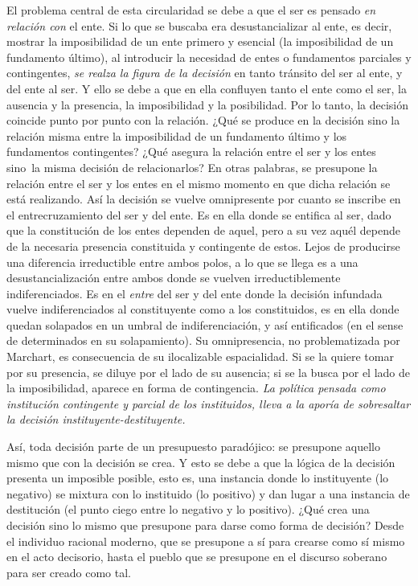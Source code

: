 El problema central de esta circularidad se debe a que el ser es pensado \emph{en relación con} el ente. Si lo que se buscaba era desustancializar al ente, es decir, mostrar la imposibilidad de un ente primero y esencial (la imposibilidad de un fundamento último), al introducir la necesidad de entes o fundamentos parciales y contingentes, \emph{se realza la figura de la decisión} en tanto tránsito del ser al ente, y del ente al ser. Y ello se debe a que en ella confluyen tanto el ente como el ser, la ausencia y la presencia, la imposibilidad y la posibilidad. Por lo tanto, la decisión coincide punto por punto con la relación. ¿Qué se produce en la decisión sino la relación misma entre la imposibilidad de un fundamento último y los fundamentos contingentes? ¿Qué asegura la relación entre el ser y los entes sino~la misma decisión de relacionarlos? En otras palabras, se presupone la relación entre el ser y los entes en el mismo momento en que dicha relación se está realizando. Así la decisión se vuelve omnipresente por cuanto se inscribe en el entrecruzamiento del ser y del ente. Es en ella donde se entifica al ser, dado que la constitución de los entes dependen de aquel, pero a su vez aquél depende de la necesaria presencia constituida y contingente de estos. Lejos de producirse una diferencia irreductible entre ambos polos, a lo que se llega es a una desustancialización entre ambos donde se vuelven irreductiblemente indiferenciados. Es en el \emph{entre} del ser y del ente donde la decisión infundada vuelve indiferenciados al constituyente como a los constituidos, es en ella donde quedan solapados en un umbral de indiferenciación, y así entificados (en el sense de determinados en su solapamiento). Su omnipresencia, no problematizada por Marchart, es consecuencia de su ilocalizable espacialidad. Si se la quiere tomar por su presencia, se diluye por el lado de su ausencia; si se la busca por el lado de la imposibilidad, aparece en forma de contingencia. \emph{La política pensada como institución contingente y parcial de los instituidos, lleva a la aporía de sobresaltar la decisión instituyente-destituyente.}

Así, toda decisión parte de un presupuesto paradójico: se presupone aquello mismo que con la decisión se crea. Y esto se debe a que la lógica de la decisión presenta un imposible posible, esto es, una instancia donde lo instituyente (lo negativo) se mixtura con lo instituido (lo positivo) y dan lugar a una instancia de destitución (el punto ciego entre lo negativo y lo positivo). ¿Qué crea una decisión sino lo mismo que presupone para darse como forma de decisión? Desde el individuo racional moderno, que se presupone a sí para crearse como sí mismo en el acto decisorio, hasta el pueblo que se presupone en el discurso soberano para ser creado como tal.

